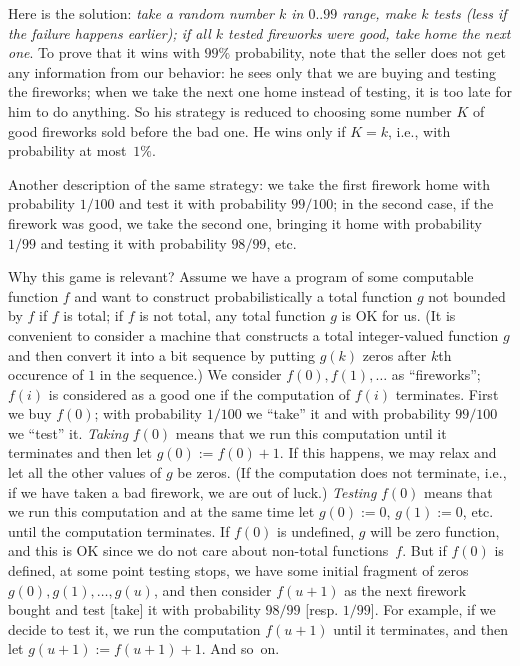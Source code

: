 \documentclass[12pt]{article}
\begin{document}
Here is the solution: \emph{take a random number $k$ in $0..99$ range, make $k$ tests \textup(less if the failure happens earlier\textup{);} if all $k$ tested fireworks were good, take home the next one}. To prove that it wins with $99\%$ probability, note that the seller does not get any information from our behavior: he sees only that we are buying and testing the fireworks; when we take the next one home instead of testing, it is too late for him to do anything. So his strategy is reduced to choosing some number $K$ of good fireworks sold before the bad one. He wins only if $K=k$, i.e., with probability at most~$1\%$.

Another description of the same strategy: we take the first firework home with probability $1/100$ and test it with probability $99/100$; in the second case, if the firework was good, we take the second one,  bringing it home with probability $1/99$ and testing it with probability $98/99$, etc.

Why this game is relevant? Assume we have a program of some computable function $f$ and want to construct probabilistically a total function $g$ not bounded by $f$ if $f$ is total; if $f$ is not total, any total function $g$ is OK for us. (It is convenient to consider a machine that constructs a total integer-valued function $g$ and then convert it into a bit sequence by putting $g(k)$ zeros after $k$th occurence of $1$ in the sequence.) We consider $f(0), f(1),\ldots$ as ``fireworks''; $f(i)$ is considered as a good one if the computation of $f(i)$ terminates. First we buy $f(0)$; with probability $1/100$ we ``take'' it and with probability $99/100$ we ``test'' it. \emph{Taking} $f(0)$ means that we run this computation until it terminates and then let $g(0):=f(0)+1$. If this happens, we may relax and let all the other values of $g$ be zeros. (If the computation does not terminate, i.e., if we have taken a bad firework, we are out of luck.) \emph{Testing} $f(0)$ means that we run this computation and at the same time let $g(0):=0$, $g(1):=0$, etc. until the computation terminates. If $f(0)$ is undefined, $g$ will be zero function, and this is OK since we do not care about non-total functions~$f$. But if $f(0)$ is defined, at some point testing stops, we have some initial fragment of zeros $g(0),g(1),\ldots,g(u)$, and then consider $f(u+1)$ as the next firework bought and test [take] it with probability $98/99$ [resp. $1/99$]. For example, if we decide to test it, we run the computation $f(u+1)$ until it terminates, and then let $g(u+1):=f(u+1)+1$. And so~on.
\end{document}
